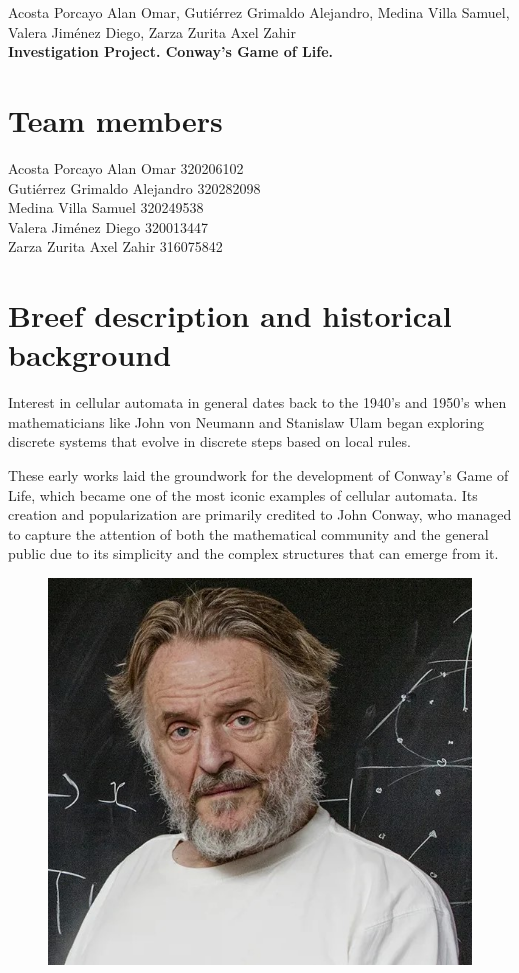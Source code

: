 \documentclass[12pt]{article}
\newcommand{\linejump}{\hfill \break}
\begin{document}
  \begin{center}
    Acosta Porcayo Alan Omar, Gutiérrez Grimaldo Alejandro, Medina Villa Samuel, Valera Jiménez Diego, Zarza Zurita Axel Zahir \\
    \linejump
    \LARGE \textbf{Investigation Project. Conway's Game of Life.} \\
  \end{center}  

  \section*{Team members}
  Acosta Porcayo Alan Omar 320206102 \\
  Gutiérrez Grimaldo Alejandro 320282098 \\
  Medina Villa Samuel 320249538 \\
  Valera Jiménez Diego 320013447 \\
  Zarza Zurita Axel Zahir 316075842

  \section*{Breef description and historical background}
  Interest in cellular automata in general dates back to the 1940's and 1950's when mathematicians like John von Neumann and Stanislaw Ulam began exploring discrete systems that evolve in discrete steps based on local rules. 
  
  These early works laid the groundwork for the development of Conway's Game of Life, which became one of the most iconic examples of cellular automata. Its creation and popularization are primarily credited to John Conway, who managed to capture the attention of both the mathematical community and the general public due to its simplicity and the complex structures that can emerge from it.
  
  \begin{figure}
    \centering
    \includegraphics[width=\linewidth, center]{conway.jpg}
  \end{figure}
  
\end{document}
